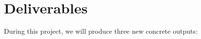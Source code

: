 \documentclass[11pt]{article}
\begin{document}


\section{Deliverables}
During this project, we will produce three new concrete outputs:
\end{document}
